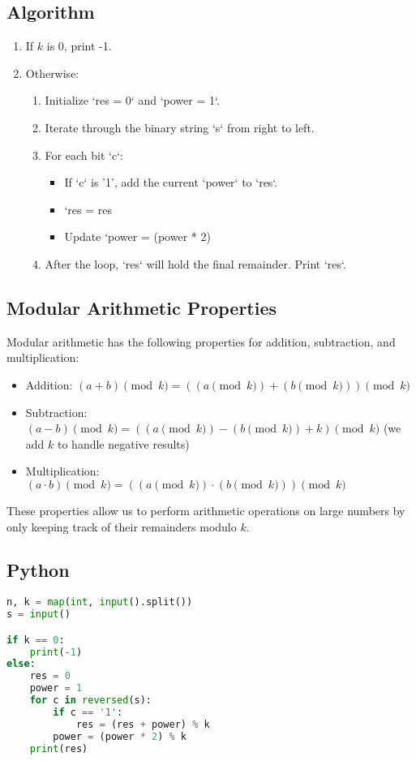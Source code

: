 \documentclass{article}
\begin{document}
\subsection*{Algorithm}
\begin{enumerate}
    \item If $k$ is 0, print -1.
    \item Otherwise:
    \begin{enumerate}
        \item Initialize `res = 0` and `power = 1`.
        \item Iterate through the binary string `s` from right to left.
        \item For each bit `c`:
        \begin{itemize}
            \item If `c` is '1', add the current `power` to `res`.
            \item `res = res %
            \item Update `power = (power * 2) %
        \end{itemize}
        \item After the loop, `res` will hold the final remainder. Print `res`.
    \end{enumerate}
\end{enumerate}

\subsection*{Modular Arithmetic Properties}
Modular arithmetic has the following properties for addition, subtraction, and multiplication:
\begin{itemize}
    \item Addition: $(a + b) \pmod{k} = ((a \pmod{k}) + (b \pmod{k})) \pmod{k}$
    \item Subtraction: $(a - b) \pmod{k} = ((a \pmod{k}) - (b \pmod{k}) + k) \pmod{k}$ (we add $k$ to handle negative results)
    \item Multiplication: $(a \cdot b) \pmod{k} = ((a \pmod{k}) \cdot (b \pmod{k})) \pmod{k}$
\end{itemize}
These properties allow us to perform arithmetic operations on large numbers by only keeping track of their remainders modulo $k$.

\subsection*{Python}
\begin{lstlisting}[language=Python]
n, k = map(int, input().split())
s = input()

if k == 0:
    print(-1)
else:
    res = 0
    power = 1
    for c in reversed(s):
        if c == '1':
            res = (res + power) % k
        power = (power * 2) % k
    print(res)
\end{lstlisting}
\end{document}
